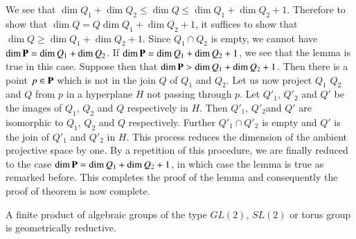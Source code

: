 We see that $\dim Q_{1}+\dim Q_{2}\leq \dim Q\leq \dim Q_{1}+\dim Q_{2}+1$. Therefore to show that $\dim Q=Q\dim Q_{1}+\dim Q_{2}+1$, it suffices to show that $\dim Q\geq \dim Q_{1}+\dim Q_{2}+1$. Since $Q_{1}\cap Q_{2}$ is empty, we cannot have $\dim \mathbf{P}=\dim Q_{1}+\dim Q_{2}$. If $\dim \mathbf{P}=\dim Q_{1}+\dim Q_{2}+1$, we see that the lemma is true in this case. Suppose then that $\dim \mathbf{P}>\dim Q_{1}+\dim Q_{2}+1$. Then there is a point $p\in \mathbf{P}$ which is not in the join $Q$ of $Q_{1}$ and $Q_{2}$. Let us now project $Q_{1}$ $Q_{2}$ and $Q$ from $p$ in a hyperplane $H$ not passing through $p$. Let $Q'_{1}$, $Q'_{2}$ and $Q'$ be the images of $Q_{1}$, $Q_{2}$ and $Q$ respectively in $H$. Then $Q'_{1}$, $Q'_{2}$\pageoriginale and $Q'$ are isomorphic to $Q_{1}$, $Q_{2}$ and $Q$ respectively. Further $Q'_{1}\cap Q'_{2}$ is empty and $Q'$ is the join of $Q'_{1}$ and $Q'_{2}$ in $H$. This process reduces the dimension of the ambient projective space by one. By a repetition of this procedure, we are finally reduced to the case $\dim \mathbf{P}=\dim Q_{1}+\dim Q_{2}+1$, in which case the lemma is true as remarked before. This completes the proof of the lemma and consequently the proof of theorem is now complete.

\begin{coro*}
A finite product of algebraic groups of the type $GL(2)$, $SL(2)$ or torus group is geometrically reductive.
\end{coro*}

